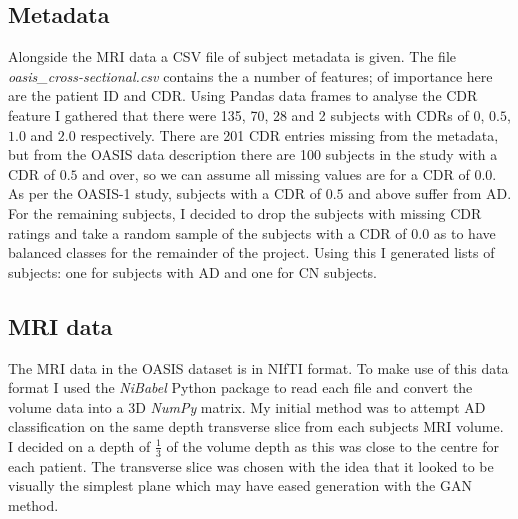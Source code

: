 \documentclass[
    author={Kai Hulme},
    supervisor={Dr Jon Bird},
    degree={BSc},
    title={Generative Adversarial Networks as an Augmentation Technique},
    subtitle={for Alzheimer's Disease Detection in MRI Volumes},
    type={Research},
    year={2021} 
]{dissertation}
\begin{document}
\subsection{Metadata}

Alongside the MRI data a CSV file of subject metadata is given. The file \textit{oasis\_cross-sectional.csv} contains the a number of features; of importance here are the patient ID and CDR. Using Pandas data frames to analyse the CDR feature I gathered that there were 135, 70, 28 and 2 subjects with CDRs of $0$, $0.5$, $1.0$ and $2.0$ respectively. There are 201 CDR entries missing from the metadata, but from the OASIS data description there are 100 subjects in the study with a CDR of $0.5$ and over, so we can assume all missing values are for a CDR of $0.0$.\\

As per the OASIS-1 study, subjects with a CDR of $0.5$ and above suffer from AD. For the remaining subjects, I decided to drop the subjects with missing CDR ratings and take a random sample of the subjects with a CDR of $0.0$ as to have balanced classes for the remainder of the project. Using this I generated lists of subjects: one for subjects with AD and one for CN subjects. 

\subsection{MRI data}

The MRI data in the OASIS dataset is in NIfTI format. To make use of this data format I used the \textit{NiBabel} Python package to read each file and convert the volume data into a 3D \textit{NumPy} matrix. My initial method was to attempt AD classification on the same depth transverse slice from each subjects MRI volume. I decided on a depth of $\frac{1}{3}$ of the volume depth as this was close to the centre for each patient. The transverse slice was chosen with the idea that it looked to be visually the simplest plane which may have eased generation with the GAN method. \\
\end{document}

